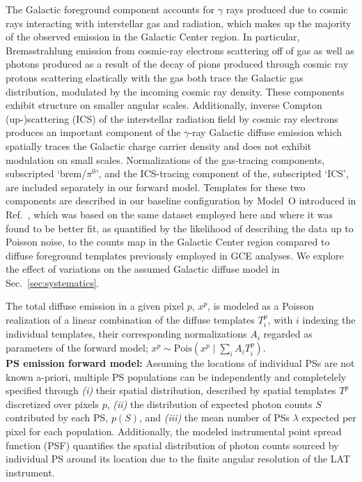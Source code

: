 \documentclass[prd,aps,10pt,nofootinbib,twocolumn,superscriptaddress,preprintnumbers,balancelastpage,longbibliography]{revtex4-1}
\begin{document}
The Galactic foreground component accounts for $\gamma$ rays produced due to cosmic rays interacting with interstellar gas and radiation, which makes up the majority of the observed emission in the Galactic Center region. In particular, Bremsstrahlung emission from cosmic-ray electrons scattering off of gas as well as photons produced as a result of the decay of pions produced through cosmic ray protons scattering elastically with the gas both trace the Galactic gas distribution, modulated by the incoming cosmic ray density. These components exhibit structure on smaller angular scales. Additionally, inverse Compton (up-)scattering (ICS) of the interstellar radiation field by cosmic ray electrons produces an important component of the $\gamma$-ray Galactic diffuse emission which spatially traces the Galactic charge carrier density and does not exhibit modulation on small scales. Normalizations of the gas-tracing components, subscripted `brem/$\pi^0$', and the ICS-tracing component of the, subscripted `ICS', are included separately in our forward model. Templates for these two components are described in our baseline configuration by {Model~O} introduced in Ref.~\cite{Buschmann:2020adf}, which was based on the same \Fermi dataset employed here and where it was found to be better fit, as quantified by the likelihood of describing the data up to Poisson noise, to the counts map in the Galactic Center region compared to diffuse foreground templates previously employed in GCE analyses. We explore the effect of variations on the assumed Galactic diffuse model in Sec.~\ref{sec:systematics}. 

The total diffuse emission in a given pixel $p$, $x^p$, is modeled as a Poisson realization of a linear combination of the diffuse templates $T^p_i$, with $i$ indexing the individual templates, their corresponding normalizations $A_i$ regarded as parameters of the forward model; $x^p \sim \mathrm{Pois}\left(x^p\mid\sum_i A_i T^p_i\right)$. \\  %

\noindent
\textbf{PS emission forward model:} Assuming the locations of individual PSs are not known a-priori, multiple PS populations can be independently and completelely specified through \emph{(i)} their spatial distribution, described by spatial templates $T^p$ discretized over pixels $p$, \emph{(ii)} the distribution of expected photon counts $S$ contributed by each PS, $p(S)$, and \emph{(iii)} the mean number of PSs $\lambda$ expected per pixel for each population.  Additionally, the modeled instrumental point spread function (PSF) quantifies the spatial distribution of photon counts sourced by individual PS around its location due to the finite angular resolution of the LAT instrument.
\end{document}
